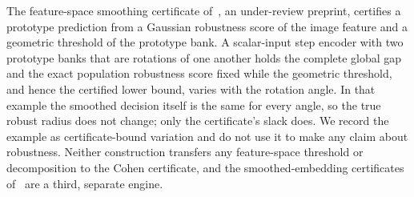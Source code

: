 The feature-space smoothing certificate of~\cite{xia2026feature}, an
under-review preprint, certifies a prototype prediction from a Gaussian
robustness score of the image feature and a geometric threshold of the
prototype bank. A scalar-input step encoder with two prototype banks that are
rotations of one another holds the complete global gap and the exact
population robustness score fixed while the geometric threshold, and hence the
certified lower bound, varies with the rotation angle. In that example the
smoothed decision itself is the same for every angle, so the true robust
radius does not change; only the certificate's slack does. We record the
example as certificate-bound variation and do not use it to make any claim
about robustness. Neither construction transfers any feature-space threshold
or decomposition to the Cohen certificate, and the smoothed-embedding
certificates of~\cite{pautov2022smoothed} are a third, separate engine.

